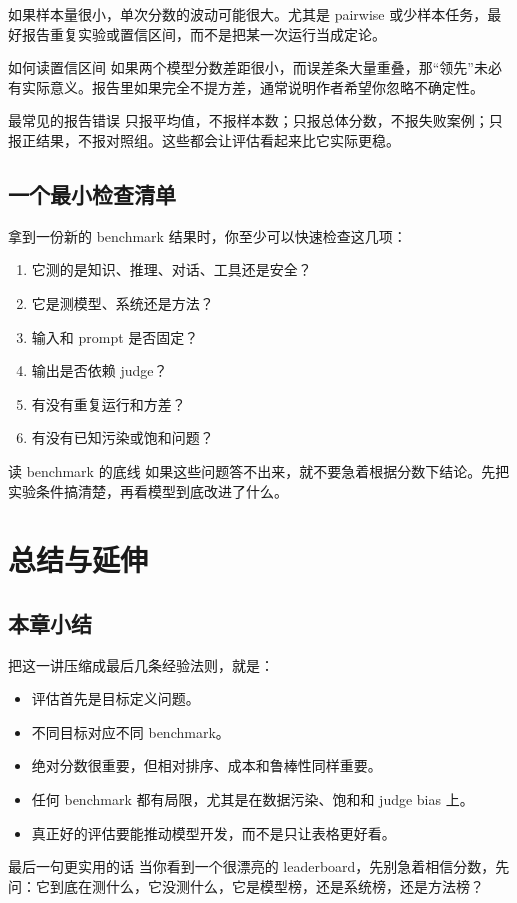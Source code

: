 \documentclass[a4paper]{article}
\begin{document}
如果样本量很小，单次分数的波动可能很大。尤其是 pairwise 或少样本任务，最好报告重复实验或置信区间，而不是把某一次运行当成定论。

\begin{knowledgebox}{如何读置信区间}
如果两个模型分数差距很小，而误差条大量重叠，那“领先”未必有实际意义。报告里如果完全不提方差，通常说明作者希望你忽略不确定性。
\end{knowledgebox}

\begin{warningbox}{最常见的报告错误}
只报平均值，不报样本数；只报总体分数，不报失败案例；只报正结果，不报对照组。这些都会让评估看起来比它实际更稳。
\end{warningbox}

\subsection{一个最小检查清单}

拿到一份新的 benchmark 结果时，你至少可以快速检查这几项：
\begin{enumerate}
    \item 它测的是知识、推理、对话、工具还是安全？
    \item 它是测模型、系统还是方法？
    \item 输入和 prompt 是否固定？
    \item 输出是否依赖 judge？
    \item 有没有重复运行和方差？
    \item 有没有已知污染或饱和问题？
\end{enumerate}

\begin{importantbox}{读 benchmark 的底线}
如果这些问题答不出来，就不要急着根据分数下结论。先把实验条件搞清楚，再看模型到底改进了什么。
\end{importantbox}

\section{总结与延伸}

\subsection{本章小结}

把这一讲压缩成最后几条经验法则，就是：
\begin{itemize}
    \item 评估首先是目标定义问题。
    \item 不同目标对应不同 benchmark。
    \item 绝对分数很重要，但相对排序、成本和鲁棒性同样重要。
    \item 任何 benchmark 都有局限，尤其是在数据污染、饱和和 judge bias 上。
    \item 真正好的评估要能推动模型开发，而不是只让表格更好看。
\end{itemize}

\begin{importantbox}{最后一句更实用的话}
当你看到一个很漂亮的 leaderboard，先别急着相信分数，先问：它到底在测什么，它没测什么，它是模型榜，还是系统榜，还是方法榜？
\end{importantbox}
\end{document}
